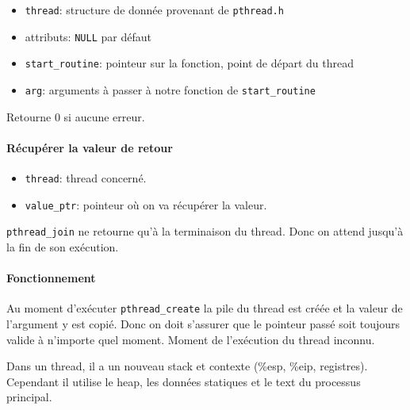 \begin{itemize}
\tightlist
\item
  \texttt{thread}: structure de donnée provenant de \texttt{pthread.h}
\item
  attributs: \texttt{NULL} par défaut
\item
  \texttt{start\_routine}: pointeur sur la fonction, point de départ du
  thread
\item
  \texttt{arg}: arguments à passer à notre fonction de
  \texttt{start\_routine}
\end{itemize}

Retourne \(0\) si aucune erreur.

\paragraph{Récupérer la valeur de
retour}\label{ruxe9cupuxe9rer-la-valeur-de-retour}

\begin{Shaded}
\begin{Highlighting}[]

\OperatorTok{(}\OperatorTok{,}  \OperatorTok{**}\OperatorTok{);}
\end{Highlighting}
\end{Shaded}

\begin{itemize}
\tightlist
\item
  \texttt{thread}: thread concerné.
\item
  \texttt{value\_ptr}: pointeur où on va récupérer la valeur.
\end{itemize}

\texttt{pthread\_join} ne retourne qu'à la terminaison du thread. Donc
on attend jusqu'à la fin de son exécution.

\paragraph{Fonctionnement}\label{fonctionnement}

Au moment d'exécuter \texttt{pthread\_create} la pile du thread est
créée et la valeur de l'argument y est copié. Donc on doit s'assurer que
le pointeur passé soit toujours valide à n'importe quel moment. Moment
de l'exécution du thread inconnu.

Dans un thread, il a un nouveau stack et contexte (\%esp, \%eip,
registres). Cependant il utilise le heap, les données statiques et le
text du processus principal.

